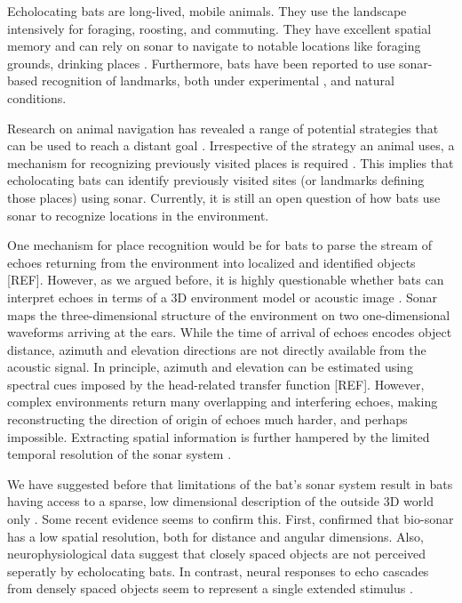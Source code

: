\documentclass[preprint,5p]{elsarticle}
\begin{document}
Echolocating bats are long-lived, mobile animals. They use the landscape intensively for foraging, roosting, and commuting. They have excellent spatial memory \citep{Barchi2013,VonHelversen2005} and can rely on sonar to navigate to notable locations like foraging grounds, drinking places \citep[see][for references]{Vanderelst2016,Vanderelst2017}. Furthermore, bats have been reported to use sonar-based recognition of landmarks, both under experimental \citep{Jensen2005,Yu2019}, and natural \citep{Verboom1999} conditions.

Research on animal navigation has revealed a range of potential strategies that can be used to reach a distant goal \citep[Reviewed by][]{Franz2000}. Irrespective of the strategy an animal uses, a mechanism for recognizing previously visited places is required \citep{Vanderelst2016,Vanderelst2017}. This implies that echolocating bats can identify previously visited sites (or landmarks defining those places) using sonar. Currently, it is still an open question of how bats use sonar to recognize locations in the environment.

One mechanism for place recognition would be for bats to parse the stream of echoes returning from the environment into localized and identified objects [REF]. However, as we argued before, it is highly questionable whether bats can interpret echoes in terms of a 3D environment model or acoustic image \citep[e.g.,][]{Vanderelst2015,Vanderelst2016,Steckel2013}. Sonar maps the three-dimensional structure of the environment on two one-dimensional waveforms arriving at the ears. While the time of arrival of echoes encodes object distance, azimuth and elevation directions are not directly available from the acoustic signal. In principle, azimuth and elevation can be estimated using spectral cues imposed by the head-related transfer function [REF]. However, complex environments return many overlapping and interfering echoes, making reconstructing the direction of origin of echoes much harder, and perhaps impossible. Extracting spatial information is further hampered by the limited temporal resolution of the sonar system \citep{Simmons1989,Wiegrebe1996,Surlykke1996}. 

We have suggested before that limitations of the bat's sonar system result in bats having access to a sparse, low dimensional description of the outside 3D world only \citep{Vanderelst2015a,Vanderelst2016}. Some recent evidence seems to confirm this. First, \citet{Geberl2019} confirmed that bio-sonar has a low spatial resolution, both for distance and angular dimensions. Also, neurophysiological data suggest that closely spaced objects are not perceived seperatly by echolocating bats. In contrast, neural responses to echo cascades from densely spaced objects seem to represent a single extended stimulus \citep{Warnecke2018}. 
\end{document}
